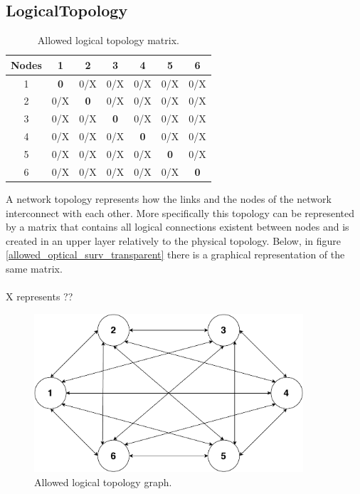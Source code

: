 \subsection{LogicalTopology}

\begin{table}[H]
	\centering	
	\begin{tabular}{|c|c|c|c|c|c|c|}
		\hline
		\multicolumn{1}{|l|}{\textbf{Nodes}} & 1   & 2   & 3   & 4   & 5   & 6   \\ \hline
		1                           & \textbf{0}   & 0/X & 0/X & 0/X & 0/X & 0/X \\ \hline
		2                           & 0/X & \textbf{0}   & 0/X & 0/X & 0/X & 0/X \\ \hline
		3                           & 0/X & 0/X & \textbf{0}   & 0/X & 0/X & 0/X \\ \hline
		4                           & 0/X & 0/X & 0/X & \textbf{0}   & 0/X & 0/X \\ \hline
		5                           & 0/X & 0/X & 0/X & 0/X & \textbf{0}   & 0/X \\ \hline
		6                           & 0/X & 0/X & 0/X & 0/X & 0/X & \textbf{0}   \\ \hline
	\end{tabular}
	\caption{Allowed logical topology matrix.}
	\label{logical_topology}
\end{table}

A network topology represents how the links and the nodes of the network interconnect with each other. More specifically this topology can be represented by a matrix that contains all logical connections existent between nodes and is created in an upper layer relatively to the physical topology. Below, in figure \ref{allowed_optical_surv_transparent} there is a graphical representation of the same matrix.\\ \\
X represents  ??%

\begin{figure}[H]
	\centering
	\includegraphics[width=10cm]{sdf/heuristic/transparent/figures/logicalTopology}
	\caption{Allowed logical topology graph.}
	\label{allowed_optical_surv_transparent2}
\end{figure}


